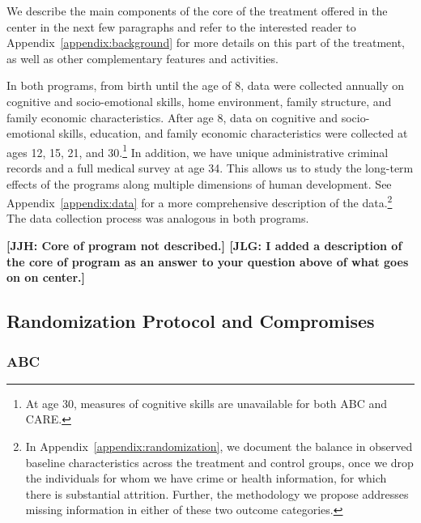 We describe the main components of the core of the treatment offered in the center in the next few paragraphs and refer to the interested reader to Appendix~\ref{appendix:background} for more details on this part of the treatment, as well as other complementary features and activities.

\begin{center}

\end{center}

In both programs, from birth until the age of 8, data were collected annually on cognitive and socio-emotional skills, home environment, family structure, and family economic characteristics. After age 8, data on cognitive and socio-emotional skills, education, and family economic characteristics were collected at ages 12, 15, 21, and 30.\footnote{At age 30, measures of cognitive skills are unavailable for both ABC and CARE.} In addition, we have unique administrative criminal records and a full medical survey at age 34. This allows us to study the long-term effects of the programs along multiple dimensions of human development. See Appendix~\ref{appendix:data} for a more comprehensive description of the data.\footnote{In Appendix~\ref{appendix:randomization}, we document the balance in observed baseline characteristics across the treatment and control groups, once we drop the individuals for whom we have crime or health information, for which there is substantial attrition. Further, the methodology we propose addresses missing information in either of these two outcome categories.} The data collection process was analogous in both programs.

\textbf{[JJH: Core of program not described.] [JLG: I added a description of the core of program as an answer to your question above of what goes on on center.]}

\subsection{Randomization Protocol and Compromises} \label{section:randomization}

\subsubsection{ABC}

